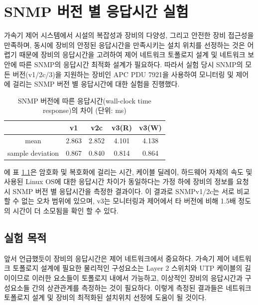 \documentclass[11pt
  , a4paper
  , article
  , oneside
]{memoir}
\begin{document}
\clearpage

\chapter{SNMP 버전 별 응답시간 실험}
가속기 제어 시스템에서 시설의 복잡성과 장비의 다양성, 그리고 안전한 장비 접근성을 만족하며, 동시에 장비의 안정된 응답시간을 만족시키는 설치 위치를 선정하는 것은 어렵기 때문에 장비의 응답시간을 고려하여 제어 네트워크 토폴로지 설계 및 네트워크 보안에 따른 SNMP의 응답시간 최적화 설계가 필요하다. 따라서 실험 당시 SNMP의 모든 버전(v1/2c/3)을 지원하는 장비인 APC PDU 7921을 사용하여 모니터링 및 제어에 걸리는 SNMP 버전 별 응답시간에 대한 실험을 진행했다.

\begin{table}[h!]
\begin{center}
\begin{tabular}{c|c|c|c|c}\hline
 & v1 & v2c & v3(R) & v3(W) \\ \hline
mean & 2.863 & 2.852 & 4.101 & 4.138 \\ \hline
sample deviation & 0.867 & 0.840 & 0.814 & 0.864 \\ \hline
\end{tabular}
\caption{SNMP 버전에 따른 응답시간(wall-clock time response)의 차이 (단위: ms)}
  \label{table:test}  
\end{center}
\end{table}에
표 \ref{table:test}은 암호화 및 복호화에 걸리는 시간, 케이블 딜레이, 하드웨어 자체의 속도 및 사용된 Linux OS에 대한 응답시간 차이가 동일하다는 가정 하에 장비의 정보를 요청 시 SNMP 버전 별 응답시간을 측정한 결과이다. 이 결과로 SNMPv1/2c는 서로 비교할 수 없는 오차 범위에 있으며, v3는 모니터링과 제어에서 타 버전에 비해 1.5배 정도의 시간이 더 소모됨을 확인 할 수 있다.

\section{실험 목적}
앞서 언급했듯이 장비의 응답시간은 제어 네트워크에서 중요하다. 가속기 제어 네트워크 토폴로지 설계에 필요한 물리적인 구성요소는 Layer 2 스위치와 UTP 케이블의 길이이므로 이러한 요소들이 토폴로지 내에서 가능하고, 이상적인 장비의 응답시간과 구성요소들 간의 상관관계를 측정하는 것이 필요하다. 이렇게 측정된 결과들은 네트워크 토폴로지 설계 및 장비의 최적화된 설치위치 선정에 도움이 될 것이다.
\end{document}
